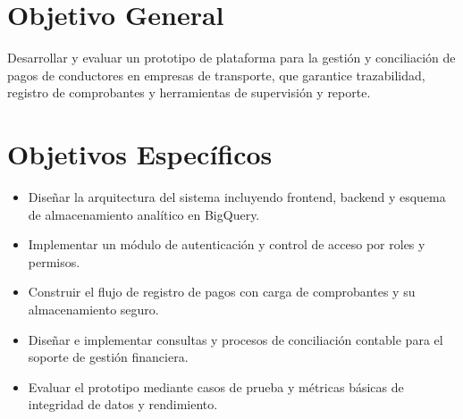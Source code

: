 \section*{Objetivo General}

Desarrollar y evaluar un prototipo de plataforma para la gestión y conciliación de pagos de conductores en empresas de transporte, que garantice trazabilidad, registro de comprobantes y herramientas de supervisión y reporte.

\section*{Objetivos Específicos}

\begin{itemize}
  \item Diseñar la arquitectura del sistema incluyendo frontend, backend y esquema de almacenamiento analítico en BigQuery.
  \item Implementar un módulo de autenticación y control de acceso por roles y permisos.
  \item Construir el flujo de registro de pagos con carga de comprobantes y su almacenamiento seguro.
  \item Diseñar e implementar consultas y procesos de conciliación contable para el soporte de gestión financiera.
  \item Evaluar el prototipo mediante casos de prueba y métricas básicas de integridad de datos y rendimiento.
\end{itemize}
